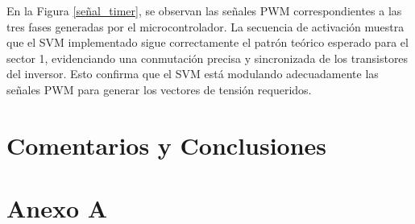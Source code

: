 \documentclass[11pt]{report}
\begin{document}
En la Figura \ref{señal_timer}, se observan las señales PWM correspondientes a las tres fases generadas por el microcontrolador. La secuencia de activación muestra que el SVM implementado sigue correctamente el patrón teórico esperado para el sector 1, evidenciando una conmutación precisa y sincronizada de los transistores del inversor. Esto confirma que el SVM está modulando adecuadamente las señales PWM para generar los vectores de tensión requeridos.

\newpage
\chapter*{Comentarios y Conclusiones}

\newpage
{}
\printbibliography

\newpage
{}

\chapter*{Anexo A}
\end{document}

